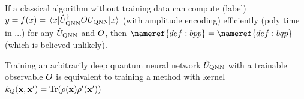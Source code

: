 \begin{proposition}
	If a classical algorithm without training data can compute (label) $y=f(x)=\mel{x}{\hat{U}_{\textup{QNN}}^\dagger OU_{\textup{QNN}}}{x}$ (with amplitude encoding) efficiently (poly time in ...) for any $\hat{U}_{\textup{QNN}}$ and $O$, then $\nameref{def:bpp}=\nameref{def:bqp}$ (which is believed unlikely).
\end{proposition}
\begin{proposition}
	Training an arbitrarily deep quantum neural network $\hat{U}_{\textup{QNN}}$ with a trainable observable $O$ is equivalent to training a  method with kernel $k_{Q}(\vb{x},\vb{x}')=\Tr(\rho(\vb{x})\rho'(\vb{x}'))$
\end{proposition}

